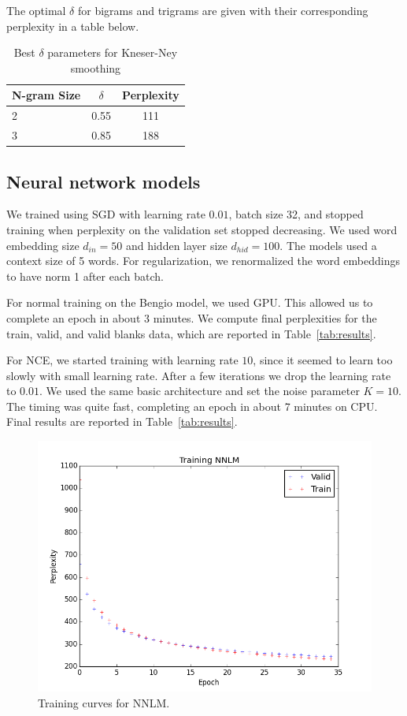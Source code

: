 \documentclass[11pt]{article}
\begin{document}
The optimal $\delta$ for bigrams and trigrams are given with their corresponding perplexity in a table below. 

\begin{table}[h]
  \centering
  \begin{tabular}{lcc}
    \toprule
    N-gram Size & $\delta$ & Perplexity \\
    \midrule
    2 & 0.55 & 111 \\
    3 & 0.85 & 188 \\
    \bottomrule
  \end{tabular}
  \caption{\label{tab:delta} Best $\delta$ parameters for Kneser-Ney smoothing}
\end{table}

\subsection{Neural network models}

We trained using SGD with learning rate $0.01$, batch size 32, and stopped training when perplexity on the validation set stopped decreasing. We used word embedding size $d_{in} = 50$ and hidden layer size $d_{hid} = 100$. The models used a context size of 5 words. For regularization, we renormalized the word embeddings to have norm 1 after each batch.

For normal training on the Bengio model, we used GPU. This allowed us to complete an epoch in about 3 minutes. We compute final perplexities for the train, valid, and valid blanks data, which are reported in Table~\ref{tab:results}.

For NCE, we started training with learning rate $10$, since it seemed to learn too slowly with small learning rate. After a few iterations we drop the learning rate to $0.01$. We used the same basic architecture and set the noise parameter $K = 10$. The timing was quite fast, completing an epoch in about 7 minutes on CPU. Final results are reported in Table~\ref{tab:results}.

\begin{figure}[h]
\centering
\includegraphics[scale=0.5]{nnlm_train}
\caption{Training curves for NNLM.}
\end{figure}
\end{document}
